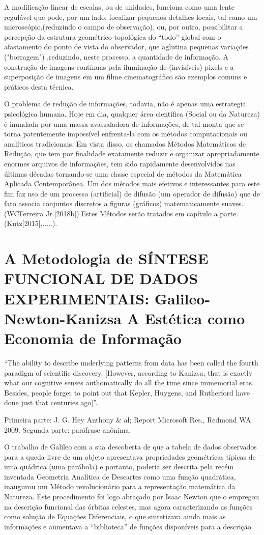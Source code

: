 {    A modificação linear de escalas, ou de unidades, funciona como uma lente regulável que pode, por um lado, focalizar pequenos detalhes locais, tal como um microscópio,(reduzindo o campo de observação), ou, por outro, possibilitar a percepção da estrutura geométrico-topológica do ``todo'' global com o afastamento do ponto de vista do observador, que aglutina pequenas variações ("borragem") ,reduzindo, neste processo, a quantidade de informação. A construção de imagens contínuas pela iluminação de (invisíveis) pixels e a superposição de imagens em um filme cinematográfico são exemplos comuns e práticos desta técnica.

    O problema de redução de informações, todavia, não é apenas uma estrategia psicológica humana. Hoje em dia, qualquer área científica (Social ou da Natureza) é inundada por uma massa avassaladora de informações, de tal monta que se torna patentemente impossível enfrenta-la com os métodos computacionais ou analíticos tradicionais. Em vista disso, os chamados Métodos Matemáticos de Redução, que tem por finalidade exatamente reduzir e organizar apropriadamente enormes arquivos de informações, tem sido rapidamente desenvolvidos nas últimas décadas tornando-se uma classe especial de métodos da Matemática Aplicada Contemporânea. Um dos métodos mais efetivos e interessantes para este fim faz uso de um processo (artificial) de difusão (um operador de difusão) que de fato associa conjuntos discretos a figuras (gráficos) matematicamente suaves.(WCFerreira Jr.[2018b]).Estes Métodos serão tratados em capítulo a parte.(Kutz[2015],.....).


}


\section{A Metodologia de SÍNTESE FUNCIONAL DE DADOS EXPERIMENTAIS: Galileo-Newton-Kanizsa A Estética como Economia de Informação}

    ``The ability to describe underlying patterns from data has been called the fourth paradigm of scientific discovery. [However, according to Kanizsa, that is exactly what our cognitive senses authomatically do all the time since immemorial eras. Besides, people forget to point out that Kepler, Huygens, and Rutherford have done just that centuries ago]''.

    Primeira parte: J. G. Hey Anthony \& al; Report Microsoft Res., Redmond WA 2009. Segunda parte: paráfrase anônima.

    O trabalho de Galileo com a sua descoberta de que a tabela de dados observados para a queda livre de um objeto apresentava propriedades geométricas típicas de uma quádrica (uma parábola) e portanto, poderia ser descrita pela recém inventada Geometria Analítica de Descartes como uma função quadrática, inaugurou um Método revolucionário para a representação matemática da Natureza. Este procedimento foi logo abraçado por Isaac Newton que o empregou na descrição funcional das órbitas celestes, mas agora caracterizando as funções como solução de Equações Diferenciais, o que sintetizava ainda mais as informações e aumentava a ``biblioteca'' de funções disponíveis para a descrição.

